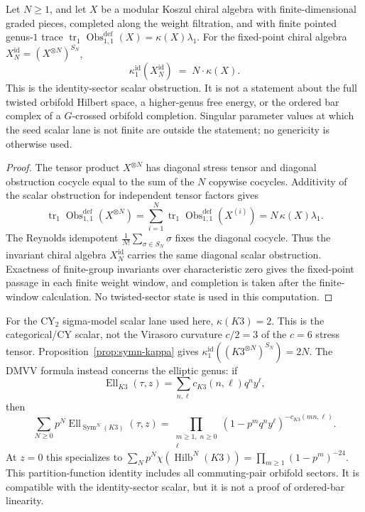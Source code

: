 \begin{proposition}\label{prop:symn-kappa}
Let $N\geq1$, and let $X$ be a modular Koszul chiral algebra with
finite-dimensional graded pieces, completed along the weight
filtration, and with finite pointed genus-$1$ trace
$\operatorname{tr}_1\operatorname{Obs}^{\mathrm{def}}_{1,1}(X)
=\kappa(X)\lambda_1$. For the fixed-point chiral algebra
$X_N^{\mathrm{id}}=(X^{\otimes N})^{S_N}$,
\[
 \kappa^{\mathrm{id}}_1(X_N^{\mathrm{id}})
 \;=\; N \cdot \kappa(X).
\]
This is the identity-sector scalar obstruction. It is not a
statement about the full twisted orbifold Hilbert space, a
higher-genus free energy, or the ordered bar complex of a
$G$-crossed orbifold completion. Singular parameter values at which
the seed scalar lane is not finite are outside the statement; no
genericity is otherwise used.
\end{proposition}

\begin{proof}
The tensor product $X^{\otimes N}$ has diagonal stress tensor and
diagonal obstruction cocycle equal to the sum of the $N$ copywise
cocycles. Additivity of the scalar obstruction for independent
tensor factors gives
\[
 \operatorname{tr}_1\operatorname{Obs}^{\mathrm{def}}_{1,1}(X^{\otimes N})
 = \sum_{i=1}^N
   \operatorname{tr}_1\operatorname{Obs}^{\mathrm{def}}_{1,1}(X^{(i)})
 = N\,\kappa(X)\lambda_1 .
\]
The Reynolds idempotent
$\frac1{N!}\sum_{\sigma\in S_N}\sigma$ fixes the diagonal cocycle.
Thus the invariant chiral algebra $X_N^{\mathrm{id}}$ carries the
same diagonal scalar obstruction. Exactness of finite-group
invariants over characteristic zero gives the fixed-point passage in
each finite weight window, and completion is taken after
the finite-window calculation. No twisted-sector state is used in
this computation.
\end{proof}

\begin{remark}
\label{rem:symn-k3-elliptic-identity}
For the CY$_2$ sigma-model scalar lane used here,
$\kappa(K3)=2$. This is the categorical/CY scalar, not the
Virasoro curvature $c/2=3$ of the $c=6$ stress tensor.
Proposition~\ref{prop:symn-kappa} gives
$\kappa^{\mathrm{id}}_1((K3^{\otimes N})^{S_N})=2N$.
The DMVV formula \cite{DMVV97} instead concerns the elliptic genus:
if
\[
 \operatorname{Ell}_{K3}(\tau,z)
 =\sum_{n,\ell}c_{K3}(n,\ell)q^n y^\ell,
\]
then
\[
 \sum_{N\geq0}p^N
 \operatorname{Ell}_{\operatorname{Sym}^N(K3)}(\tau,z)
 =
 \prod_{\substack{m\geq1,\; n\geq0\\ \ell}}
 (1-p^m q^n y^\ell)^{-c_{K3}(mn,\ell)} .
\]
At $z=0$ this specializes to
$\sum_N p^N\chi(\operatorname{Hilb}^N(K3))
=\prod_{m\geq1}(1-p^m)^{-24}$.
This partition-function identity includes all commuting-pair
orbifold sectors. It is compatible with the identity-sector scalar,
but it is not a proof of ordered-bar linearity.
\end{remark}

